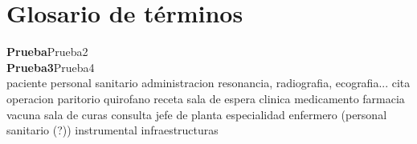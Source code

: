 \documentclass[11pt,a4paper]{article}
\newcommand{\term}[2]{\textbf{#1}\quad#2\\}
\begin{document}
\section{Glosario de términos} %
\label{sec:glosario_de_términos}

\term{Prueba}{Prueba2}
\term{Prueba3}{Prueba4}
paciente
personal sanitario
administracion
resonancia, radiografia, ecografia...
cita
operacion
paritorio
quirofano
receta
sala de espera
clinica
medicamento
farmacia
vacuna
sala de curas
consulta
jefe de planta
especialidad
enfermero (personal sanitario (?))
instrumental
infraestructuras


	
\end{document}
